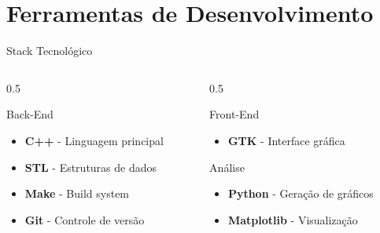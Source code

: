 \documentclass{beamer}
\begin{document}
\section{Ferramentas de Desenvolvimento}
\begin{frame}{Stack Tecnológico}
    \begin{columns}
        \begin{column}{0.5\textwidth}
            \begin{block}{Back-End}
                \begin{itemize}
                    \item \textbf{C++} - Linguagem principal
                    \item \textbf{STL} - Estruturas de dados
                    \item \textbf{Make} - Build system
                    \item \textbf{Git} - Controle de versão
                \end{itemize}
            \end{block}
        \end{column}
        \begin{column}{0.5\textwidth}
            \begin{block}{Front-End}
                \begin{itemize}
                    \item \textbf{GTK} - Interface gráfica
                \end{itemize}
            \end{block}
            \begin{block}{Análise}
                \begin{itemize}
                    \item \textbf{Python} - Geração de gráficos
                    \item \textbf{Matplotlib} - Visualização
                \end{itemize}
            \end{block}
        \end{column}
    \end{columns}
\end{frame}
\end{document}
